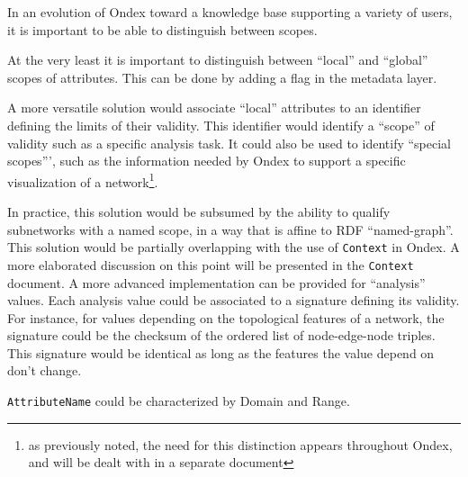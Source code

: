 \documentclass[a4paper,10pt]{article}
\newcommand{\term}[1]{\texttt{#1}\xspace}
\newcommand{\an}{\term{AttributeName}}
\begin{document}
In an evolution of Ondex toward a knowledge base supporting a variety of users, it is important to be able to distinguish between scopes.

At the very least it is important to distinguish between ``local'' and ``global'' scopes of attributes.  This can be done by adding a flag in the metadata layer.
\vskip 0.5cm

A more versatile solution would associate ``local'' attributes to an identifier defining the limits of their validity. This identifier would identify a ``scope'' of validity such as a specific analysis task. It could also be used to identify ``special scopes''', such as the information needed by Ondex to support a specific visualization of a network\footnote{as previously noted, the need for this distinction appears throughout Ondex, and will be dealt with in a separate document}.

In practice, this solution would be subsumed by the ability to qualify subnetworks with a named scope,  in a way that is affine to RDF ``named-graph''. This solution would be partially overlapping with the use of \term{Context} in Ondex. A more elaborated discussion on this point will be presented in the \term{Context} document.
\vskip 0.5cm
\noindent
A more advanced implementation can be provided for ``analysis'' values. Each analysis value could be associated to a signature defining its validity. For instance, for values depending on the topological features of a network, the signature could be the checksum of the ordered list of node-edge-node triples. This signature would be identical as long as the features the value depend on don't change.

\vskip 0.5cm
\noindent
\an could be characterized by Domain and Range.
\end{document}
